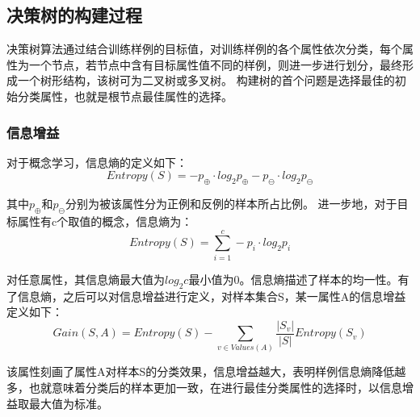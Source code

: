 \documentclass[a4papper]{article}
\begin{document}
\subsection{决策树的构建过程}
\par\setlength{\parindent}{2em} %
决策树算法通过结合训练样例的目标值，对训练样例的各个属性依次分类，每个属性为一个节点，若节点中含有目标属性值不同的样例，则进一步进行划分，最终形成一个树形结构，该树可为二叉树或多叉树。
构建树的首个问题是选择最佳的初始分类属性，也就是根节点最佳属性的选择。
\subsubsection{信息增益}
\par\setlength{\parindent}{2em} %
对于概念学习，信息熵的定义如下：
\begin{equation*}
Entropy(S) = -p_{\oplus} \cdot log_2 p_{\oplus} - p_{\ominus} \cdot log_2 p_{\ominus}
\end{equation*}
\par\setlength{\parindent}{2em} %
其中$p_{\oplus}$和$p_{\ominus}$分别为被该属性分为正例和反例的样本所占比例。
进一步地，对于目标属性有c个取值的概念，信息熵为：
\begin{equation*}
Entropy(S) = \sum_{i = 1}^{c} -p_{i} \cdot log_2 p_{i}
\end{equation*}
\par\setlength{\parindent}{2em} %
对任意属性，其信息熵最大值为$log_2 c$最小值为0。信息熵描述了样本的均一性。有了信息熵，之后可以对信息增益进行定义，对样本集合S，某一属性A的信息增益定义如下：
\begin{equation*}
Gain(S, A) = Entropy(S) - \sum_{v \in Values(A)}\frac{\left|S_v\right|}{\left|S\right|}Entropy(S_v)
\end{equation*}
\par\setlength{\parindent}{2em} %
该属性刻画了属性A对样本S的分类效果，信息增益越大，表明样例信息熵降低越多，也就意味着分类后的样本更加一致，在进行最佳分类属性的选择时，以信息增益取最大值为标准。
\end{document}
